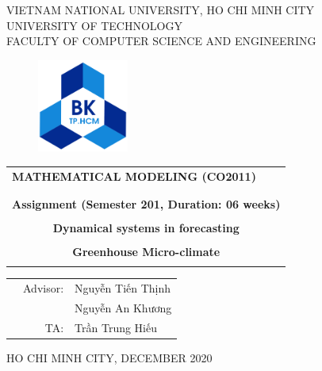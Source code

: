 \documentclass[a4paper]{article}
\begin{document}
\begin{titlepage}
  \begin{center}
    VIETNAM NATIONAL UNIVERSITY, HO CHI MINH CITY \\
    UNIVERSITY OF TECHNOLOGY \\
    FACULTY OF COMPUTER SCIENCE AND ENGINEERING
  \end{center}

  \vspace{1cm}

  \begin{figure}[h!]
    \begin{center}
      \includegraphics[width=3cm]{hcmut.png}
    \end{center}
  \end{figure}

  \vspace{1cm}


  \begin{center}
    \begin{tabular}{c}
      \multicolumn{1}{l}{\textbf{{\Large MATHEMATICAL MODELING  (CO2011)}}}               \\
      {}                                                                                  \\
      \hline
      \\
      \multicolumn{1}{l}{\textbf{{\Large Assignment (Semester 201, Duration: 06 weeks)}}} \\
      \\
      \textbf{{\Huge Dynamical systems in forecasting}}                                   \\
      \\
      \textbf{{\Huge Greenhouse Micro-climate}}                                           \\
      \\
      \hline
    \end{tabular}
  \end{center}

  \vspace{3cm}

  \begin{table}[h]
    \begin{tabular}{rrl}
      \hspace{5 cm} & Advisor: & Nguyễn Tiến Thịnh \\
                    &          & Nguyễn An Khương  \\
                    & TA:      & Trần Trung Hiếu   \\
    \end{tabular}
  \end{table}

  \begin{center}
    {\footnotesize HO CHI MINH CITY, DECEMBER 2020}
  \end{center}
\end{titlepage}
\end{document}
